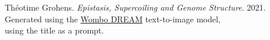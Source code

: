 \begin{vplace}[4]
\centering
Théotime Grohens.
\emph{Epistasis, Supercoiling and Genome Structure}.
2021. \\
Generated using the \href{https://www.wombo.art/}{Wombo DREAM} text-to-image model, \\ using the title as a prompt.
\end{vplace}
\thispagestyle{empty}
